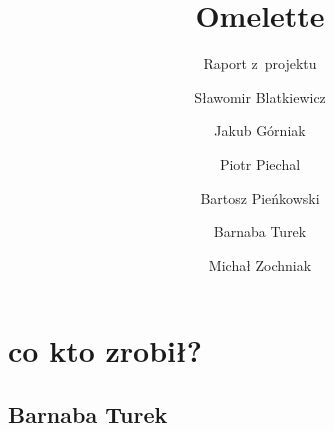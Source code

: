 \documentclass[a4paper]{scrartcl}
\begin{document}
\sloppy

\title{Omelette}
\subtitle{Raport z~projektu}
\author{
  Sławomir Blatkiewicz\and
  Jakub Górniak       \and
  Piotr Piechal       \and
  Bartosz Pieńkowski  \and
  Barnaba Turek       \and
  Michał Zochniak
}
\maketitle
\section{co kto zrobił?}
\subsection{Barnaba Turek}

\end{document}
